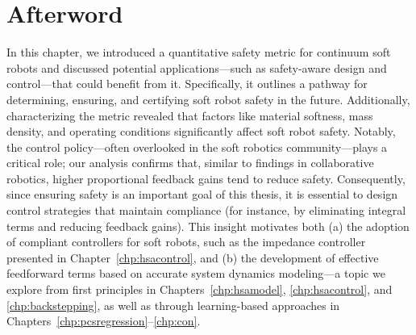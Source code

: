 \section*{Afterword}
In this chapter, we introduced a quantitative safety metric for continuum soft robots and discussed potential applications—such as safety-aware design and control—that could benefit from it. Specifically, it outlines a pathway for determining, ensuring, and certifying soft robot safety in the future. Additionally, characterizing the metric revealed that factors like material softness, mass density, and operating conditions significantly affect soft robot safety. Notably, the control policy—often overlooked in the soft robotics community—plays a critical role; our analysis confirms that, similar to findings in collaborative robotics, higher proportional feedback gains tend to reduce safety. Consequently, since ensuring safety is an important goal of this thesis, it is essential to design control strategies that maintain compliance (for instance, by eliminating integral terms and reducing feedback gains). This insight motivates both (a) the adoption of compliant controllers for soft robots, such as the impedance controller presented in Chapter~\ref{chp:hsacontrol}, and (b) the development of effective feedforward terms based on accurate system dynamics modeling—a topic we explore from first principles in Chapters~\ref{chp:hsamodel}, \ref{chp:hsacontrol}, and \ref{chp:backstepping}, as well as through learning-based approaches in Chapters~\ref{chp:pcsregression}–\ref{chp:con}.